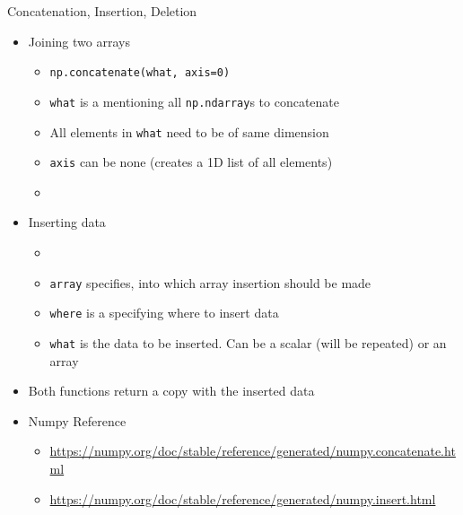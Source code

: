 
\begin{frame}[fragile]{Concatenation, Insertion, Deletion}
%
\begin{itemize}
\item Joining two arrays
	\begin{itemize}
	\item \texttt{np.concatenate(what, axis=0)}
	\item \texttt{what} is a  mentioning all \texttt{np.ndarray}s to concatenate
	\item All elements in \texttt{what} need to be of same dimension
	\item \texttt{axis} can be none (creates a 1D list of all elements)
	\item 
	\end{itemize}
\item Inserting data
	\begin{itemize}
	\item {}
	\item \texttt{array} specifies, into which array insertion should be made
	\item \texttt{where} is a  specifying where to insert data
	\item \texttt{what} is the data to be inserted. Can be a scalar (will be repeated) or an array
	\end{itemize}
\item Both functions return a copy with the inserted data
\item Numpy Reference
	\begin{itemize}
	\item \scriptsize \url{https://numpy.org/doc/stable/reference/generated/numpy.concatenate.html}
	\item \scriptsize \url{https://numpy.org/doc/stable/reference/generated/numpy.insert.html}
	\end{itemize}
\end{itemize}
%
\end{frame}


